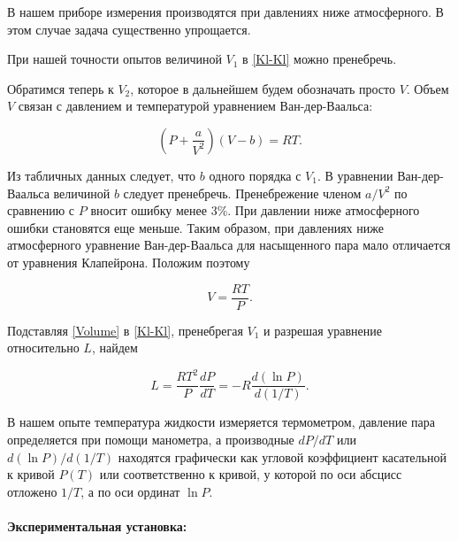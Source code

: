 \documentclass[a4paper, 12pt]{article}
\newcommand{\parag}[1]{\paragraph*{#1:}}
\begin{document}
В нашем приборе измерения производятся при давлениях ниже атмосферного. В этом случае задача существенно упрощается.

При нашей точности опытов величиной $ V_1 $ в \eqref{Kl-Kl} можно пренебречь.

Обратимся теперь к $ V_2 $, которое в дальнейшем будем обозначать просто $ V $. Объем $ V $ связан с давлением и температурой уравнением Ван-дер-Ваальса:

\begin{equation}\label{VDV}
\left(P+\frac{a}{V^2}\right)\left(V-b\right)=RT.
\end{equation}

Из табличных данных следует, что $ b $ одного порядка с $ V_1 $. В уравнении Ван-дер-Ваальса величиной $ b $ следует пренебречь. Пренебрежение членом $ a/V^2 $ по сравнению с $ P $ вносит ошибку менее 3\%. При давлении ниже атмосферного ошибки становятся еще меньше. Таким образом, при давлениях ниже атмосферного уравнение Ван-дер-Ваальса для насыщенного пара мало отличается от уравнения Клапейрона. Положим поэтому

\begin{equation}\label{Volume}
V=\frac{RT}{P}.
\end{equation}

Подставляя \eqref{Volume} в \eqref{Kl-Kl}, пренебрегая $ V_1 $ и разрешая уравнение относительно $ L $, найдем

\begin{equation}\label{final}
L=\frac{RT^2}{P}\frac{dP}{dT}=-R\frac{d(\ln P)}{d(1/T)}.
\end{equation}

В нашем опыте температура жидкости измеряется термометром, давление пара определяется при помощи манометра, а производные $ dP/dT $ или $ d(\ln P)/d(1/T) $ находятся графически как угловой коэффициент касательной к кривой $ P(T) $ или соответственно к кривой, у которой по оси абсцисс отложено $ 1/T $, а по оси ординат $ \ln P $.

\parag {Экспериментальная установка}~\\
\end{document}
